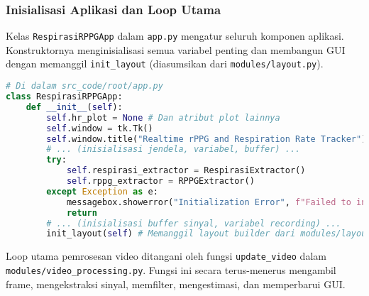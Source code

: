 \documentclass[11pt,a4paper]{article}
\begin{document}
\subsubsection{Inisialisasi Aplikasi dan Loop Utama}
Kelas \texttt{RespirasiRPPGApp} dalam \texttt{app.py} mengatur seluruh komponen aplikasi. Konstruktornya menginisialisasi semua variabel penting dan membangun GUI dengan memanggil \texttt{init\_layout} (diasumsikan dari \texttt{modules/layout.py}).
\begin{lstlisting}[language=Python, caption=Inisialisasi Aplikasi dari file \texttt{src\_code/root/app.py}, label={lst:app_init}]
# Di dalam src_code/root/app.py
class RespirasiRPPGApp:
    def __init__(self):
        self.hr_plot = None # Dan atribut plot lainnya
        self.window = tk.Tk()
        self.window.title("Realtime rPPG and Respiration Rate Tracker")
        # ... (inisialisasi jendela, variabel, buffer) ...
        try:
            self.respirasi_extractor = RespirasiExtractor()
            self.rppg_extractor = RPPGExtractor()
        except Exception as e:
            messagebox.showerror("Initialization Error", f"Failed to initialize extractors: {str(e)}")
            return
        # ... (inisialisasi buffer sinyal, variabel recording) ...
        init_layout(self) # Memanggil layout builder dari modules/layout.py
\end{lstlisting}
Loop utama pemrosesan video ditangani oleh fungsi \texttt{update\_video} dalam \texttt{modules/video\_processing.py}. Fungsi ini secara terus-menerus mengambil frame, mengekstraksi sinyal, memfilter, mengestimasi, dan memperbarui GUI.
\end{document}

